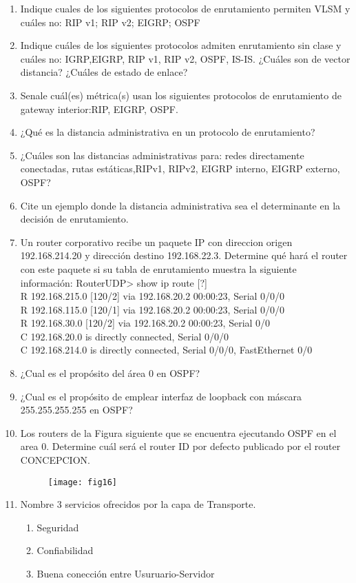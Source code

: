 \documentclass{udparticle}
\begin{document}
\begin{enumerate}
\item Indique cuales de los siguientes protocolos de enrutamiento permiten VLSM y 
cuáles no: RIP v1; RIP v2; EIGRP; OSPF
\item Indique cuáles de los siguientes protocolos admiten enrutamiento sin clase y 
cuáles no: IGRP,EIGRP, RIP v1, RIP v2, OSPF, IS-IS. ¿Cuáles son de vector 
distancia? ¿Cuáles de estado de enlace?
\item Senale cuál(es) métrica(s) usan los siguientes protocolos de enrutamiento de gateway interior:RIP, EIGRP, OSPF.
\item ¿Qué es la distancia administrativa en un protocolo de enrutamiento?
\item ¿Cuáles son las distancias administrativas para: redes directamente conectadas, rutas estáticas,RIPv1, RIPv2, EIGRP interno, EIGRP externo, OSPF?
\item Cite un ejemplo donde la distancia administrativa sea el determinante en la decisión de enrutamiento.
\item Un router corporativo recibe un paquete IP con direccion origen 
192.168.214.20 y dirección destino 192.168.22.3. Determine qué hará el router con este paquete si su tabla de enrutamiento muestra la
siguiente información: 
RouterUDP> show ip route [?]\\
R 192.168.215.0 [120/2] via 192.168.20.2 00:00:23, Serial 0/0/0\\
R 192.168.115.0 [120/1] via 192.168.20.2 00:00:23, Serial 0/0/0\\
R 192.168.30.0 [120/2] via 192.168.20.2 00:00:23, Serial 0/0\\
C 192.168.20.0 is directly connected, Serial 0/0/0\\
C 192.168.214.0 is directly connected, Serial 0/0/0, FastEthernet 0/0\\
\item ¿Cual es el propósito del área 0 en OSPF?
\item ¿Cual es el propósito de emplear interfaz de loopback con máscara
255.255.255.255 en OSPF?
\item Los routers de la Figura siguiente que  se encuentra ejecutando OSPF en el 
area 0. 
Determine cuál será el router ID por defecto publicado por el router 
CONCEPCION.
	\begin{figure}[H]
	\centering
	\texttt{[image: fig16]}
	\end{figure}
\item Nombre 3 servicios ofrecidos por la capa de Transporte.
\begin{enumerate}
\item Seguridad 
\item Confiabilidad
\item Buena conección entre Usuruario-Servidor
\end{enumerate}
\end{enumerate}
\end{document}

